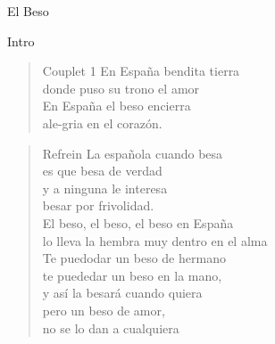 \begin{song}{El Beso}

\begin{instrumental}{Intro}
 \measure{} \measure{}  \measure{} \measure{} \measure{} \measure{}
 \measure{} \measure{} \measure{} \measure{}  \measure{}  \measure{}    
\end{instrumental}

\begin{verse}{Couplet 1}
En España bendita tierra\\
donde puso su trono el amor\\
En España el beso encierra\\
ale-gria en el corazón.\\
\end{verse}

\begin{verse}{Refrein}
La española cuando besa \\
es que besa de verdad\\
y a ninguna le interesa\\
besar por frivolidad.\\
El beso,\hspace{5em} el beso, el beso en España\\
lo lleva \hspace{5em} la hembra muy dentro en el alma\\
Te puedodar un beso de hermano \\
te puededar un beso en la mano, \\
y así la besará cuando quiera\\
pero un beso de amor,\\
no se lo dan a cualquiera\\
\end{verse}


\end{song}
